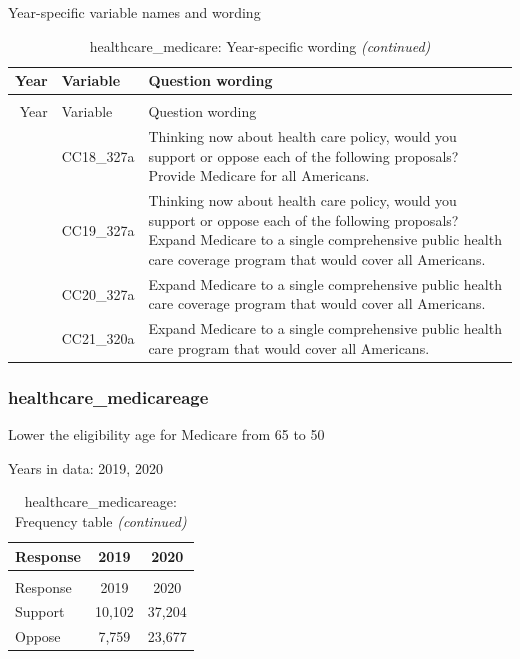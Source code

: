 \documentclass[
  12pt]{article}
\begin{document}
Year-specific variable names and
wording\begingroup\fontsize{11}{13}\selectfont

\begin{longtable}[t]{rl>{\raggedright\arraybackslash}p{10cm}}
\caption{\label{tab:unnamed-chunk-5}healthcare\_medicare: Year-specific wording}\\
\toprule
Year & Variable & Question wording\\
\midrule
\endfirsthead
\caption[]{healthcare\_medicare: Year-specific wording \textit{(continued)}}\\
\toprule
Year & Variable & Question wording\\
\midrule
\endhead

\endfoot
\bottomrule
\endlastfoot
2018 & CC18\_327a & Thinking now about health care policy, would you support or oppose each of the following proposals? Provide Medicare for all Americans.\\
\addlinespace
2019 & CC19\_327a & Thinking now about health care policy, would you support or oppose each of the following proposals? Expand Medicare to a single comprehensive public health care coverage program that would cover all Americans.\\
\addlinespace
2020 & CC20\_327a & Expand Medicare to a single comprehensive public health care coverage program that would cover all Americans.\\
\addlinespace
2021 & CC21\_320a & Expand Medicare to a single comprehensive public health care program that would cover all Americans.\\*
\end{longtable}
\endgroup{}

\hypertarget{healthcare_medicareage}{%
\subsubsection{healthcare\_medicareage}\label{healthcare_medicareage}}

Lower the eligibility age for Medicare from 65 to 50

Years in data: 2019, 2020\begingroup\fontsize{10}{12}\selectfont

\begin{longtable}[t]{lcc}
\caption{\label{tab:unnamed-chunk-5}healthcare\_medicareage: Frequency table}\\
\toprule
Response & 2019 & 2020\\
\midrule
\endfirsthead
\caption[]{healthcare\_medicareage: Frequency table \textit{(continued)}}\\
\toprule
Response & 2019 & 2020\\
\midrule
\endhead

\endfoot
\bottomrule
\endlastfoot
Support & 10,102 & 37,204\\
Oppose & 7,759 & 23,677\\*
\end{longtable}
\endgroup{}
\end{document}
